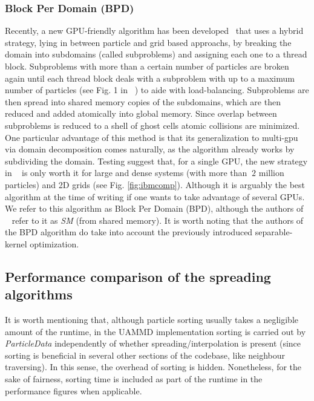 \documentclass[twoside,openright,titlepage,numbers=noenddot,%
headinclude,footinclude,cleardoublepage=empty,abstract=on,
BCOR=5mm,fontsize=11pt, dvipsnames, paper=b5
]{scrreprt}
\newcommand{\uammd}{\gls{UAMMD}\xspace}
\newcommand{\gpu}{\gls{GPU}\xspace}
\begin{document}
\subsubsection*{Block Per Domain (BPD)}
Recently, a new \gpu-friendly algorithm has been developed~\cite{Shih2021} that uses a hybrid strategy, lying in between particle and grid based approachs, by breaking the domain into subdomains (called subproblems) and assigning each one to a thread block. Subproblems with more than a certain number of particles are broken again until each thread block deals with a subproblem with up to a maximum number of particles (see Fig. 1 in ~\cite{Shih2021}) to aide with load-balancing. Subproblems are then spread into shared memory copies of the subdomains, which are then reduced and added atomically into global memory. Since overlap between subproblems is reduced to a shell of ghost cells atomic collisions are minimized. One particular advantage of this method is that its generalization to multi-gpu via domain decomposition comes naturally, as the algorithm already works by subdividing the domain. Testing suggest that, for a single \gpu, the new strategy in ~\cite{Shih2021} is only worth it for large and dense systems (with more than $~2$ million particles) and 2D grids (see Fig. \ref{fig:ibmcomp}). Although it is arguably the best algorithm at the time of writing if one wants to take advantage of several GPUs.
We refer to this algorithm as Block Per Domain (BPD), although the authors of ~\cite{Shih2021} refer to it as \emph{SM} (from shared memory). It is worth noting that the authors of the BPD algorithm do take into account the previously introduced separable-kernel optimization.

\subsection*{Performance comparison of the spreading algorithms}
It is worth mentioning that, although particle sorting usually takes a negligible amount of the runtime, in the \uammd implementation sorting is carried out by \emph{ParticleData} independently of whether spreading/interpolation is present (since sorting is beneficial in several other sections of the codebase, like neighbour traversing). In this sense, the overhead of sorting is hidden. Nonetheless, for the sake of fairness, sorting time is included as part of the runtime in the performance figures when applicable.
\end{document}
